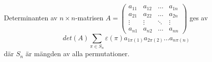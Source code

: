 Determinanten av $n\times n$-matrisen $A=\begin{pmatrix}
    a_{11}&a_{12}&\ldots& a_{1n}\\
    a_{21}&a_{22}&\ldots&a_{2n}\\
    \vdots&\vdots&\ddots&\vdots\\
    a_{n1}&a_{n2}&\ldots&a_{nn}
\end{pmatrix}$
ges av 
\begin{equation*}
    det(A)\sum_{\pi\in S_{n}}\varepsilon(\pi)a_{1\pi(1)}a_{2\pi(2)}\ldots a_{n\pi(n)}
\end{equation*}
där $S_{n}$ är mängden av alla permutationer.
